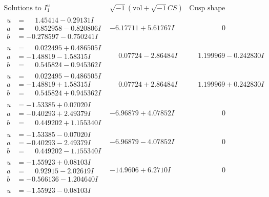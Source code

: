\documentclass[1p]{elsarticle_modified}
\theoremstyle{definition}
\newcommand{\I}{\sqrt{-1}}
\begin{document}
$$\begin{array}{c|c|c}
\text{Solutions to }I^u_{1}& \I (\text{vol} + \sqrt{-1}CS) & \text{Cusp shape}\\
 \hline 
\begin{aligned}
u &= \phantom{-}1.45414 - 0.29131 I \\
a &= \phantom{-}0.852958 - 0.820806 I \\
b &= -0.278597 - 0.750241 I\end{aligned}
 & -6.17711 + 5.61767 I & \phantom{-0.000000 } 0 \\ \hline\begin{aligned}
u &= \phantom{-}0.022495 + 0.486505 I \\
a &= -1.48819 - 1.58315 I \\
b &= \phantom{-}0.545824 - 0.945362 I\end{aligned}
 & \phantom{-}0.07724 - 2.86484 I & \phantom{-}1.199969 - 0.242830 I \\ \hline\begin{aligned}
u &= \phantom{-}0.022495 - 0.486505 I \\
a &= -1.48819 + 1.58315 I \\
b &= \phantom{-}0.545824 + 0.945362 I\end{aligned}
 & \phantom{-}0.07724 + 2.86484 I & \phantom{-}1.199969 + 0.242830 I \\ \hline\begin{aligned}
u &= -1.53385 + 0.07020 I \\
a &= -0.40293 + 2.49379 I \\
b &= \phantom{-}0.449202 + 1.155340 I\end{aligned}
 & -6.96879 + 4.07852 I & \phantom{-0.000000 } 0 \\ \hline\begin{aligned}
u &= -1.53385 - 0.07020 I \\
a &= -0.40293 - 2.49379 I \\
b &= \phantom{-}0.449202 - 1.155340 I\end{aligned}
 & -6.96879 - 4.07852 I & \phantom{-0.000000 } 0 \\ \hline\begin{aligned}
u &= -1.55923 + 0.08103 I \\
a &= \phantom{-}0.92915 - 2.02619 I \\
b &= -0.566136 - 1.204640 I\end{aligned}
 & -14.9606 + 6.2710 I & \phantom{-0.000000 } 0 \\ \hline\begin{aligned}
u &= -1.55923 - 0.08103 I \\

\end{aligned}
\end{array}$$
\end{document}
